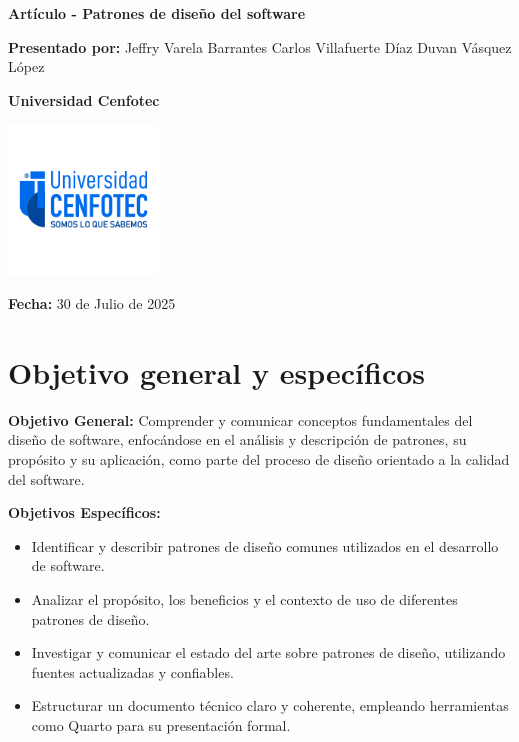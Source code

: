 \documentclass[
  11pt,
  letterpaper,
]{article}
\author{}
\date{}
\providecommand{\tightlist}{%
  \setlength{\itemsep}{0pt}\setlength{\parskip}{0pt}}
\begin{document}
\begin{titlepage}

\begin{centering}

\begin{Large}

\vspace*{3cm}

\textbf{Artículo - Patrones de diseño del software}

\vfill

\textbf{Presentado por:} \n Jeffry Varela Barrantes \n Carlos
Villafuerte Díaz \n Duvan Vásquez López

\vfill

\textbf{Universidad Cenfotec}

\includegraphics[width=4cm,height=\textheight,keepaspectratio]{img/image.png}

\vfill

\textbf{Fecha:} 30 de Julio de 2025

\vspace*{6cm}

\end{Large}

\end{centering}

\end{titlepage}

\section{Objetivo general y
específicos}\label{objetivo-general-y-especuxedficos}

\textbf{Objetivo General:} Comprender y comunicar conceptos
fundamentales del diseño de software, enfocándose en el análisis y
descripción de patrones, su propósito y su aplicación, como parte del
proceso de diseño orientado a la calidad del software.

\textbf{Objetivos Específicos:}

\begin{itemize}
\tightlist
\item
  Identificar y describir patrones de diseño comunes utilizados en el
  desarrollo de software.
\item
  Analizar el propósito, los beneficios y el contexto de uso de
  diferentes patrones de diseño.
\item
  Investigar y comunicar el estado del arte sobre patrones de diseño,
  utilizando fuentes actualizadas y confiables.
\item
  Estructurar un documento técnico claro y coherente, empleando
  herramientas como Quarto para su presentación formal.
\end{itemize}
\end{document}
